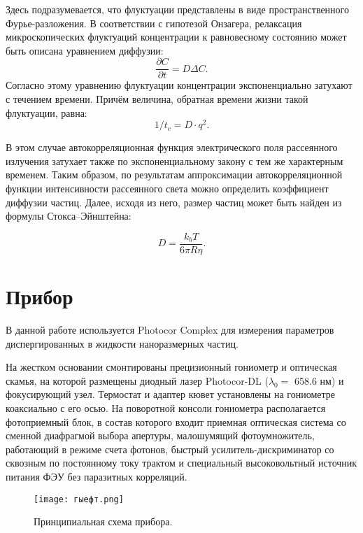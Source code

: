 \documentclass[a4paper,10pt]{article}
\begin{document}
Здесь подразумевается, что флуктуации представлены в виде пространственного Фурье-разложения. В соответствии с гипотезой Онзагера, релаксация микроскопических флуктуаций концентрации к равновесному состоянию может быть описана уравнением диффузии:
\begin{equation}
    \frac{\partial C}{\partial t} = D \Delta C.
\end{equation}
Согласно этому уравнению флуктуации концентрации экспоненциально затухают с течением времени.
Причём величина, обратная времени жизни такой флуктуации, равна:
\begin{equation}
    1/t_{c}= D \cdot q^2.
\end{equation}

В этом случае автокорреляционная функция электрического поля рассеянного излучения затухает также по экспоненциальному закону с тем же характерным временем.
Таким образом, по результатам аппроксимации автокорреляционной функции интенсивности рассеянного света можно определить коэффициент диффузии частиц. Далее, исходя из него, размер частиц может быть найден из формулы Стокса–Эйнштейна:

\begin{equation}
    D = \frac{k_{b} T}{6\pi R \eta}.
\end{equation}

\section{Прибор}
В данной работе используется Photocor Complex для измерения параметров диспергированных в жидкости наноразмерных частиц. 


На жестком основании смонтированы прецизионный гониометр и оптическая скамья, на которой размещены диодный лазер Photocor-DL ($\lambda_{0}=$
658.6 нм) и фокусирующий узел. Термостат и адаптер кювет установлены на
гониометре коаксиально с его осью. На поворотной консоли гониометра располагается фотоприемный блок, в состав которого входит приемная оптическая
система со сменной диафрагмой выбора апертуры, малошумящий фотоумножитель, работающий в режиме счета фотонов, быстрый усилитель-дискриминатор
со сквозным по постоянному току трактом и специальный высоковольтный источник питания ФЭУ без паразитных корреляций. 
\begin{figure}[H]
    \centering
    \texttt{[image: гыефт.png]}
    \caption{Принципиальная схема прибора.}
    \label{fig:enter-label}
\end{figure}
\end{document}

